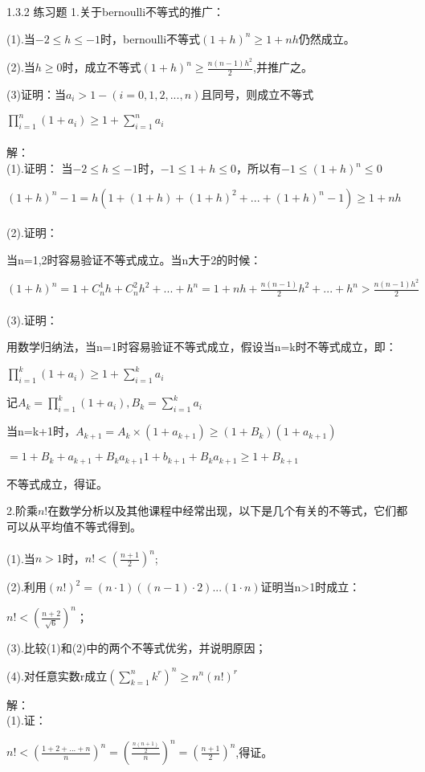 \documentclass[12pt]{ctexart}
\begin{document}
\large
1.3.2 练习题
1.关于bernoulli不等式的推广：

(1).当$-2\le{h}\le-1$时，bernoulli不等式$(1+h)^n\ge{1+nh}$仍然成立。

(2).当$h\ge0$时，成立不等式$(1+h)^n\ge{\frac{n(n-1)h^2}{2}}$,并推广之。

(3)证明：当$a_i>1-(i=0,1,2,...,n)$且同号，则成立不等式

$\prod\limits_{i=1}^n(1+a_i)\ge{1+\sum\limits_{i=1}^na_i}$
\\\\
解：\\
(1).证明：
当$-2\le{h}\le-1$时，$-1\le{1+h}\le0$，所以有$-1\le{(1+h)}^n\le0$

$(1+h)^n-1=h(1+(1+h)+{(1+h)}^2+...+{(1+h)^n-1})\ge{1+nh}$
\\\\
(2).证明：

当n=1,2时容易验证不等式成立。当n大于2的时候：

$(1+h)^n=1+C_n^1h+C_n^2h^2+...+h^n=1+nh+\frac{n(n-1)}{2}h^2+...+h^n>\frac{n(n-1)h^2}{2}$
\\\\
(3).证明：

用数学归纳法，当n=1时容易验证不等式成立，假设当n=k时不等式成立，即：

$\prod\limits_{i=1}^{k}(1+a_i)\ge{1+\sum\limits_{i=1}^ka_i}$

记$A_k=\prod\limits_{i=1}^{k}(1+a_i),B_k=\sum\limits_{i=1}^ka_i$

当n=k+1时，$A_{k+1}=A_k\times{(1+a_{k+1})}\ge{(1+B_k)}(1+a_{k+1})$

$=1+B_k+a_{k+1}+B_ka_{k+1}1+b_{k+1}+B_ka_{k+1}\ge{1+B_{k+1}}$

不等式成立，得证。

2.阶乘$n!$在数学分析以及其他课程中经常出现，以下是几个有关的不等式，它们都可以从平均值不等式得到。\\\\
(1).当$n>1$时，$n!<(\frac{n+1}{2})^n$;

(2).利用$(n!)^2=(n\cdot 1)((n-1)\cdot 2)...(1\cdot n)$证明当n>1时成立：

$n!<(\frac{n+2}{\sqrt{6}})^n$；

(3).比较(1)和(2)中的两个不等式优劣，并说明原因；

(4).对任意实数r成立$(\sum\limits_{k=1}^nk^r)^n\ge{n^n(n!)^r}$

解：\\
(1).证：

$n!<(\frac{1+2+...+n}{n})^n=(\frac{\frac{n(n+1)}{2}}{n})^n=(\frac{n+1}{2})^n$,得证。
\end{document}

